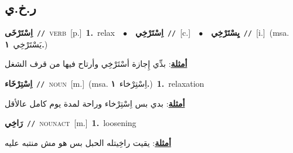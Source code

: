 \documentclass[10pt,a4paper,twoside]{article} %
\begin{document}
\begin{multicols}{2}
\vspace{-3mm}
\subsection*{\color{blue}\foreignlanguage{arabic}{ر.خ.ي}\color{blue}{}} 

{\setlength\topsep{0pt}\textbf{\foreignlanguage{arabic}{اِسْتَرْخَى}}\ {\color{gray}\texttt{//}\color{black}}\ \textsc{verb}\ [p.]\ \textbf{1.}~relax\ \ $\bullet$\ \ \setlength\topsep{0pt}\textbf{\foreignlanguage{arabic}{اِسْتَرْخِي}}\ {\color{gray}\texttt{//}\color{black}}\ [c.]\ \ $\bullet$\ \ \setlength\topsep{0pt}\textbf{\foreignlanguage{arabic}{يِسْتَرْخِي}}\ {\color{gray}\texttt{//}\color{black}}\ [i.]\ \color{gray}(msa. \foreignlanguage{arabic}{يَسْتَرْخِي}~\foreignlanguage{arabic}{\textbf{١.}})\color{black}\  \begin{flushright}\color{gray}\foreignlanguage{arabic}{\textbf{\underline{\foreignlanguage{arabic}{أمثلة}}}: بدِّي إِجازة أسْتَرْخِي وأرتاح فيها من قرف الشغل}\end{flushright}\color{black}} \vspace{2mm}

{\setlength\topsep{0pt}\textbf{\foreignlanguage{arabic}{اِسْتِرْخَاء}}\ {\color{gray}\texttt{//}\color{black}}\ \textsc{noun}\ [m.]\ \color{gray}(msa. \foreignlanguage{arabic}{اِسْتِرْخاء}~\foreignlanguage{arabic}{\textbf{١.}})\color{black}\ \textbf{1.}~relaxation\  \begin{flushright}\color{gray}\foreignlanguage{arabic}{\textbf{\underline{\foreignlanguage{arabic}{أمثلة}}}: بدي بس اِسْتِرْخاء وراحة لمدة يوم كامل عالأقل}\end{flushright}\color{black}} \vspace{2mm}

{\setlength\topsep{0pt}\textbf{\foreignlanguage{arabic}{رَاخِي}}\ {\color{gray}\texttt{//}\color{black}}\ \textsc{noun\textunderscore act}\ [m.]\ \textbf{1.}~loosening\  \begin{flushright}\color{gray}\foreignlanguage{arabic}{\textbf{\underline{\foreignlanguage{arabic}{أمثلة}}}: يقيت راخِيتله الحبل بس هو مش منتبه عليه}\end{flushright}\color{black}} \vspace{2mm}


\end{multicols}
\end{document}
